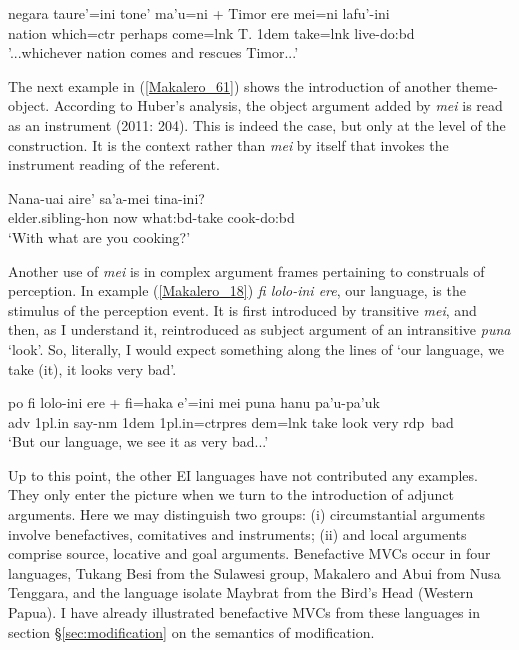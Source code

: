 \ea \label{Makalero_56}
\gll negara taure’=ini tone’ ma’u=ni + Timor ere mei=ni lafu’-ini \\
nation which=\acs{ctr} perhaps come=\acs{lnk} T. 1\acs{dem} take=\acs{lnk} live-do:\acs{bd} \\
\glft '...whichever nation comes and rescues Timor...’ \\ 
\z
\xe

The next example in (\ref{Makalero_61}) shows the introduction of another theme-object. According to Huber's analysis, the object argument added by \textit{mei} is read as an instrument (2011: 204). This is indeed the case, but only at the level of the construction. It is the context rather than \textit{mei} by itself that invokes the instrument reading of the referent.

\ea \label{Makalero_61}
\gll Nana-uai aire’ sa’a-mei tina-ini? \\
elder.sibling-\acs{hon} now what:\acs{bd}-take cook-do:\acs{bd} \\
\glft ‘With what are you cooking?’ \\ 
\z
\xe

Another use of \textit{mei} is in complex argument frames pertaining to construals of perception. In example (\ref{Makalero_18}) \textit{fi lolo-ini ere}, our language, is the stimulus of the perception event. It is first introduced by transitive \textit{mei}, and then, as I understand it, reintroduced as subject argument of an intransitive \textit{puna} `look'. So, literally, I would expect something along the lines of `our language, we take (it), it looks very bad'.

\ea \label{Makalero_18}
\gll po fi lolo-ini ere + fi=haka e’=ini mei puna hanu pa’u-pa’uk \\
\acs{adv} 1\acs{pl}.\acs{in} say-\acs{nm} 1\acs{dem} 1\acs{pl}.\acs{in}=\acs{ctrpres} \acs{dem}=\acs{lnk} take look very \acs{rdp}~bad \\
\glft ‘But our language, we see it as very bad...’ \\ 
\z
\xe

Up to this point, the other EI languages have not contributed any examples. They only enter the picture when we turn to the introduction of adjunct arguments. Here we may distinguish two groups: (i) circumstantial arguments involve benefactives, comitatives and instruments; (ii) and local arguments comprise source, locative and goal arguments. Benefactive MVCs occur in four languages, Tukang Besi from the Sulawesi group, Makalero and Abui from Nusa Tenggara, and the language isolate Maybrat from the Bird's Head (Western Papua). I have already illustrated benefactive MVCs from these languages in section §\ref{sec:modification} on the semantics of modification.


